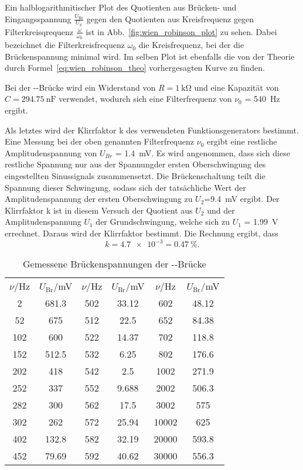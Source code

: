 Ein halblogarithmitischer Plot des Quotienten aus Brücken- und
Eingangsspannung $\frac{U_\text{Br}}{U_\text{S}}$ gegen den Quotienten
aus Kreisfrequenz gegen Filterkreisqrequenz $\frac{\omega}{\omega_0}$
ist in Abb.~\ref{fig:wien_robinson_plot} zu sehen. Dabei bezeichnet die
Filterkreisfrequenz $\omega_0$ die Kreisfrequenz, bei der die
Brückenspannung minimal wird. Im selben Plot ist ebenfalls die von der
Theorie durch Formel~\eqref{eq:wien_robinson_theo} vorhergesagten Kurve
zu finden.

Bei der --Brücke wird ein Widerstand von
$R=\SI{1}{\kilo\ohm}$ und eine Kapazität von
$C=\SI{294.75}{\nano\farad}$
verwendet, wodurch sich eine Filterfrequenz von $\nu_0$ =
\SI{540}{\hertz} ergibt.

Als letztes wird der Klirrfaktor k des verwendeten Funktionsgenerators
bestimmt.  Eine Messung bei der oben genannten Filterfrequenz $\nu_0$
ergibt eine restliche Amplitudenspannung von $U_{Br}$ =
\SI{1.4}{\milli\volt}. Es wird angenommen, dass sich diese restliche
Spannung nur aus der Spannungder ersten Oberschwingung des eingestellten
Sinussignals zusammensetzt.  Die Brückenschaltung teilt die Spannung
dieser Schwingung, sodass sich der tatsächliche Wert der
Amplitudenspannung der ersten Oberschwingung zu
$U_2$=\SI{9.4}{\milli\volt} ergibt.  Der Klirrfaktor k ist in diesem
Versuch der Quotient aus $U_2$ und der Amplitudenspannung $U_1$ der
Grundschwingung, welche sich zu $U_1$ = \SI{1.99}{\volt} errechnet.
Daraus wird der Klirrfaktor bestimmt. Die Rechnung ergibt, dass
%
\begin{equation*}
k = \num{4.7e-3} = \SI{0.47}{\percent}.
\end{equation*}
%

\begin{table}
  \centering\footnotesize
  \begin{tabular}{SSSSSS}
    \toprule
    {$\nu$/}\si{\hertz} & {$U_\text{Br}$/}\si{\milli\volt}&
    {$\nu$/}\si{\hertz} & {$U_\text{Br}$/}\si{\milli\volt}&
    {$\nu$/}\si{\hertz} & {$U_\text{Br}$/}\si{\milli\volt}\\
    \cmidrule(r){1-2} \cmidrule(rl){3-4} \cmidrule(l){5-6}
    2&681.3&502&33.12&602&48.12\\
    52&675&512&22.5&652&84.38\\
    102	&600&522	&14.37&702&118.8\\
    152&512.5&532&6.25&802&176.6\\
    202&418&542&2.5&1002&271.9\\
    252&337&552&9.688&2002&506.3\\
    282&300&562&17.5&3002&575\\
    302&262&572&25.94&10002&625\\
    402	&132.8&582&32.19&20000&593.8\\
    452&79.69&592&40.62&30000&556.3\\
    \bottomrule
  \end{tabular}
  \caption{Gemessene Brückenspannungen der
    --Brücke}
  \label{tab:wien_robinson}
\end{table}

